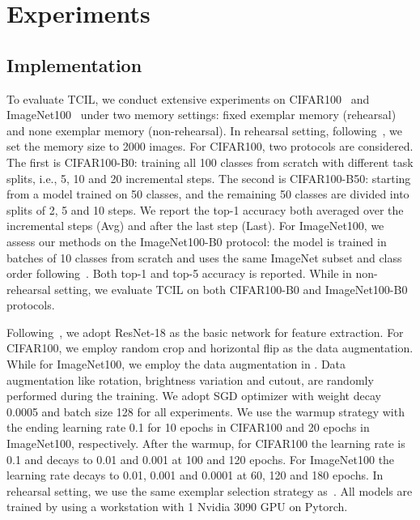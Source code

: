\documentclass[letterpaper]{article} %
\begin{document}
\section{Experiments}\label{experiment}

\subsection{Implementation}
To evaluate TCIL, we conduct extensive experiments on CIFAR100~\cite{e6} and ImageNet100~\cite{e7} under two memory settings: fixed exemplar memory (rehearsal) and none exemplar memory (non-rehearsal). In rehearsal setting, following~\cite{t0, t70, t54, t19}, we set the memory size to 2000 images. For CIFAR100, two protocols are considered. The first is CIFAR100-B0: training all 100 classes from scratch with different task splits, i.e., 5, 10 and 20 incremental steps. The second is CIFAR100-B50: starting from a model trained on 50 classes, and the remaining 50 classes are divided into splits of 2, 5 and 10 steps. We report the top-1 accuracy both averaged over the incremental steps (Avg) and after the last step (Last). For ImageNet100, we assess our methods on the ImageNet100-B0 protocol: the model is trained in batches of 10 classes from scratch and uses the same ImageNet subset and class order following~\cite{t19, t32, t54, t70}. Both top-1 and top-5 accuracy is reported. While in non-rehearsal setting, we evaluate TCIL on both CIFAR100-B0 and ImageNet100-B0 protocols.

Following~\cite{t47, t70}, we adopt ResNet-18 as the basic network for feature extraction. For CIFAR100, we employ random crop and horizontal flip as the data augmentation. While for ImageNet100, we employ the data augmentation in \cite{e13}. Data augmentation like rotation, brightness variation and cutout, are randomly performed during the training. We adopt SGD optimizer with weight decay 0.0005 and batch size 128 for all experiments. We use the warmup strategy with the ending learning rate 0.1 for 10 epochs in CIFAR100 and 20 epochs in ImageNet100, respectively. After the warmup, for CIFAR100 the learning rate is 0.1 and decays to 0.01 and 0.001 at 100 and 120 epochs. For ImageNet100 the learning rate decays to 0.01, 0.001 and 0.0001 at 60, 120 and 180 epochs. In rehearsal setting, we use the same exemplar selection strategy as~\cite{t54, t32}. All models are trained by using a workstation with 1 Nvidia 3090 GPU on Pytorch.
\end{document}
